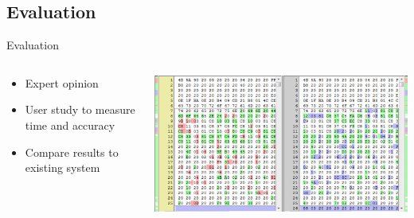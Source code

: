 \documentclass[compress]{beamer}
\begin{document}
\subsection{Evaluation}

\begin{frame}{Evaluation}
\begin{columns}[T]
\begin{column}{0.6\textwidth}
	\begin{itemize}
		\item Expert opinion
		\item User study to measure time and accuracy
		\item Compare results to existing system 
	\end{itemize}
	
\end{column}
\begin{column}{0.4\textwidth}
\includegraphics[width=1\textwidth]{pics/diff.png}
\end{column}
\end{columns}
\end{frame}
\end{document}
